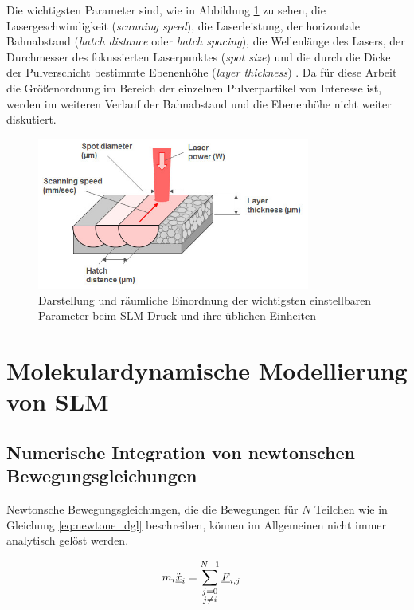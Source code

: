 		Die wichtigsten Parameter sind, wie in Abbildung \ref{fig:slm_parameters} zu sehen, die
		Lasergeschwindigkeit (\emph{scanning speed}), die Laserleistung, der horizontale
		Bahnabstand (\emph{hatch distance} oder \emph{hatch spacing}), die Wellenlänge des Lasers,
		der Durchmesser des fokussierten Laserpunktes (\emph{spot size}) und die durch die Dicke
		der Pulverschicht bestimmte Ebenenhöhe (\emph{layer thickness})
		\cite{sadali2020influence}. Da für diese Arbeit die Größenordnung im Bereich der einzelnen
		Pulverpartikel von Interesse ist, werden im weiteren Verlauf der Bahnabstand und die
		Ebenenhöhe nicht weiter diskutiert.


		\begin{figure}[ht]
			\centering
			\includegraphics[width=0.8\textwidth]{chapter/main/img/slm_parameters.jpg}
			\caption{Darstellung und räumliche Einordnung der wichtigsten einstellbaren Parameter
			beim SLM-Druck und ihre üblichen Einheiten \cite{saunders2017x}}
			\label{fig:slm_parameters}
		\end{figure}


\section{Molekulardynamische Modellierung von SLM}
	\subsection{Numerische Integration von newtonschen Bewegungsgleichungen}
		Newtonsche Bewegungsgleichungen, die die Bewegungen für $N$ Teilchen wie in Gleichung
		\eqref{eq:newtone_dgl} beschreiben, können im Allgemeinen nicht immer analytisch gelöst
		werden.

		\begin{align}
			m_i \ddot{\underline{x}}_i &= \sum_{\substack{j=0\\j \neq i}}^{N-1} \underline{F}_{i,j}
			\label{eq:newtone_dgl}
		\end{align}

